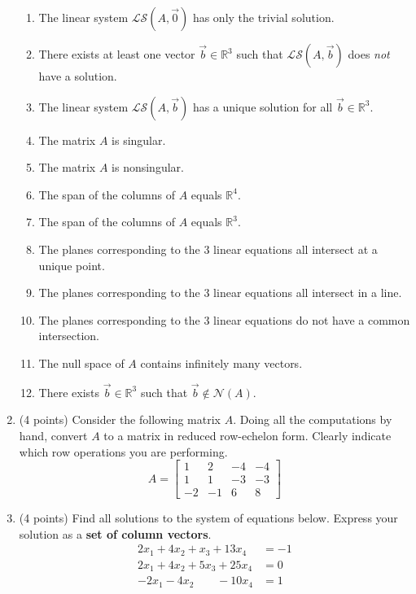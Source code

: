 \documentclass[11pt]{article}
\theoremstyle{definition}
\begin{document}
\begin{enumerate}
\begin{enumerate}
\item The linear system $\mathcal{LS}(A,\vec{0})$ has only the trivial solution.
\item There exists at least one vector $\vec{b} \in \mathbb{R}^3$ such that $\mathcal{LS}(A,\vec{b})$ does \emph{not} have a solution.
\item The linear system $\mathcal{LS}(A,\vec{b})$ has a unique solution for all $\vec{b}\in\mathbb{R}^{3}$.
\item The matrix $A$ is singular.
\item The matrix $A$ is nonsingular.
\item The span of the columns of $A$ equals $\mathbb{R}^4$.
\item The span of the columns of $A$ equals $\mathbb{R}^3$.
\item The planes corresponding to the 3 linear equations all intersect at a unique point.
\item The planes corresponding to the 3 linear equations all intersect in a line.
\item The planes corresponding to the 3 linear equations do not have a common intersection.
\item The null space of $A$ contains infinitely many vectors.
\item There exists $\vec{b}\in\mathbb{R}^{3}$ such that $\vec{b}\notin\mathcal{N}(A)$.

\end{enumerate}

\item (4 points) Consider the following matrix $A$.  Doing all the computations by hand, convert $A$ to a matrix in reduced row-echelon form.  Clearly indicate which row operations you are performing.
\[A=\begin{bmatrix}
1 & 2 & -4 & -4\\
1 & 1 & -3 & -3\\
-2 & -1 & 6 & 8
\end{bmatrix}\]

\item (4 points) Find all solutions to the system of equations below.  Express your solution as a \textbf{set of column vectors}.
\begin{align*}
2x_{1}+4x_{2}+x_{3}+13x_{4} & = -1\\
2x_{1}+4x_{2}+5x_{3}+25x_{4} & = 0\\
-2x_{1}-4x_{2}\phantom{10x_{3}}-10x_{4} & = 1
\end{align*}


\end{enumerate}
\end{document}
